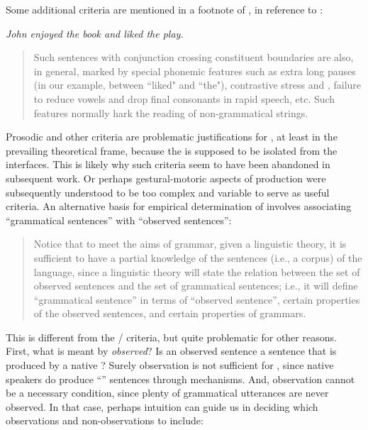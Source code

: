 Some additional  criteria are mentioned in a footnote of \citet{Chomsky1957}, in reference to :

\ea\label{ex:6:4}
\textit{John enjoyed the book and liked the play.}
\z

\begin{quote}
Such sentences with conjunction crossing constituent boundaries are also, in general, marked by special phonemic features such as extra long pauses (in our example, between ``liked" and ``the"), contrastive stress and , failure to reduce vowels and drop final consonants in rapid speech, etc. Such features normally hark the reading of non-grammatical strings. \citep[35-36]{Chomsky1957}
\end{quote}

Prosodic and other  criteria are problematic justifications for \linebreak{}, at least in the prevailing theoretical frame, because the  is supposed to be isolated from the  interfaces. This is likely why such criteria seem to have been abandoned in subsequent work. Or perhaps gestural-motoric aspects of production were subsequently understood to be too complex and variable to serve as useful criteria. An alternative basis for empirical determination of  involves associating “grammatical sentences” with “observed sentences”:

\begin{quote}	
  Notice that to meet the aims of grammar, given a linguistic theory, it is sufficient to have a partial knowledge of the sentences (i.e., a corpus) of the language, since a linguistic theory will state the relation between the set of observed sentences and the set of grammatical sentences; i.e., it will define “grammatical sentence” in terms of “observed sentence”, certain properties of the observed sentences, and certain properties of grammars. \citep[14]{Chomsky1957}
\end{quote}

  This is different from the / criteria, but quite problematic for other reasons. First, what is meant by \textit{observed}? Is an observed sentence a sentence that is produced by a native ? Surely observation is not sufficient for , since native speakers do produce “” sentences through  mechanisms. And, observation cannot be a necessary condition, since plenty of grammatical utterances are never observed. In that case, perhaps intuition can guide us in deciding which observations and non-observations to include:
  
